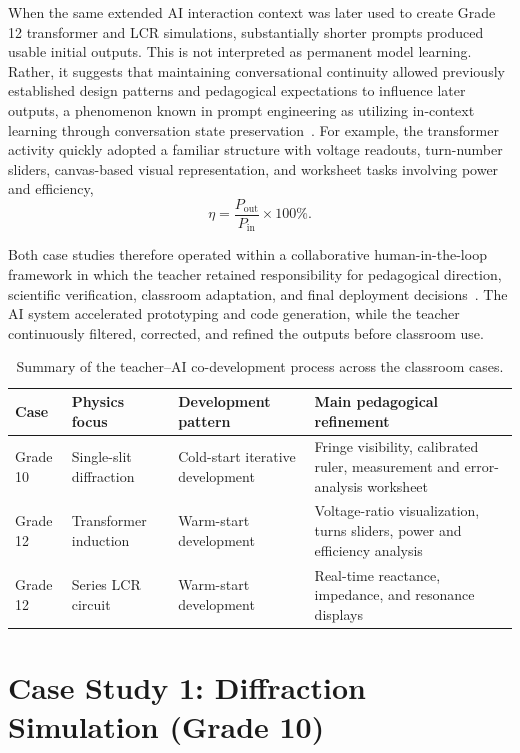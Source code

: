 \documentclass{iopjournal}
\begin{document}
When the same extended AI interaction context was later used to create Grade 12 transformer and LCR simulations, substantially shorter prompts produced usable initial outputs. This is not interpreted as permanent model learning. Rather, it suggests that maintaining conversational continuity allowed previously established design patterns and pedagogical expectations to influence later outputs, a phenomenon known in prompt engineering as utilizing in-context learning through conversation state preservation~\cite{brown2020}. For example, the transformer activity quickly adopted a familiar structure with voltage readouts, turn-number sliders, canvas-based visual representation, and worksheet tasks involving power and efficiency,
\begin{equation}
\eta = \frac{P_{\mathrm{out}}}{P_{\mathrm{in}}}\times 100\% .
\end{equation}

Both case studies therefore operated within a collaborative human-in-the-loop framework in which the teacher retained responsibility for pedagogical direction, scientific verification, classroom adaptation, and final deployment decisions~\cite{lazaros2026}. The AI system accelerated prototyping and code generation, while the teacher continuously filtered, corrected, and refined the outputs before classroom use.

\begin{table}[htbp]
\caption{Summary of the teacher--AI co-development process across the classroom cases.}
\label{tab:dev_pipeline}
\centering
\begin{tabular}{p{2.6cm} p{3.0cm} p{3.1cm} p{4.4cm}}
\hline
\textbf{Case} & \textbf{Physics focus} & \textbf{Development pattern} & \textbf{Main pedagogical refinement} \\
\hline
Grade 10 & Single-slit diffraction & Cold-start iterative development & Fringe visibility, calibrated ruler, measurement and error-analysis worksheet \\
Grade 12 & Transformer induction & Warm-start development & Voltage-ratio visualization, turns sliders, power and efficiency analysis \\
Grade 12 & Series LCR circuit & Warm-start development & Real-time reactance, impedance, and resonance displays \\
\hline
\end{tabular}
\end{table}

\section{Case Study 1: Diffraction Simulation (Grade 10)}
\end{document}

